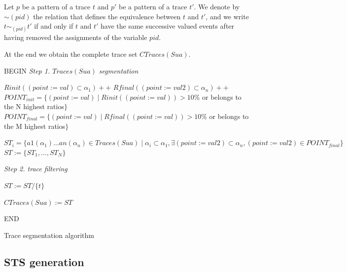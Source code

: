 \begin{definition}
    Let $p$ be a pattern of a trace $t$ and $p'$ be a pattern of
    a trace $t'$. We denote by $\sim{(pid)}$ the relation that
    defines the equivalence between $t$ and $t'$, and we write
    $t \sim_{(pid)} t'$ if and only if $t$ and $t'$ have the same
    successive valued events after having removed the assignments
    of the variable $pid$.
\end{definition}

At the end we obtain the complete trace set $CTraces(Sua)$.

\begin{algorithm}[h]


\BlankLine
BEGIN\;
\emph{Step 1. $Traces(Sua)$ segmentation}

 {
$Rinit((point:=val)\subset \alpha_1)++$\;
$Rfinal((point:=val2)\subset \alpha_n)++$\;
}
$POINT_{init}=\{(point:=val) \mid Rinit((point:=val))>10$\% or belongs to the N highest ratios$\}$\;
$POINT_{final}=\{(point:=val) \mid Rfinal((point:=val))>10$\% or belongs to the M highest ratios$\}$\;
\BlankLine

 {
	$ST_i=\{a1(\alpha_1)...an(\alpha_n)\in Traces(Sua) \mid \alpha_i\subset \alpha_1, \exists (point:=val2)\subset \alpha_n, (point:=val2)\in POINT_{final}    \}$\;
}
$ST:=\{ST_1,...,ST_N\}$\;

\BlankLine
\emph{Step 2. trace filtering}

 {
	{
		$ST:= ST/ \{  t \}$\;
	}


	}

    $CTraces(Sua) := ST$

END\;

\caption{Trace segmentation algorithm}
\label{algo_traces}
\end{algorithm}

\subsection{STS generation}
\label{sec:modelinf:prodsystems:generation}

